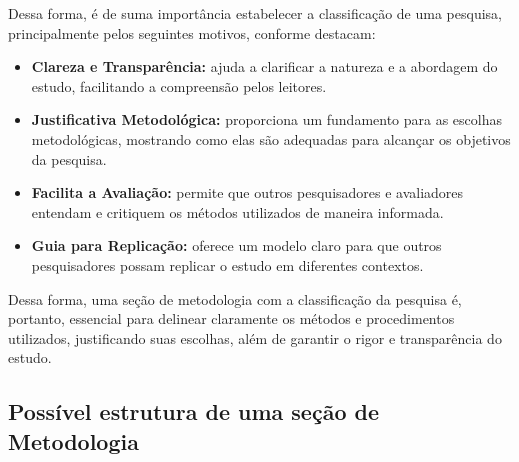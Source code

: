 Dessa forma, é de suma importância estabelecer a classificação de uma pesquisa, principalmente pelos seguintes motivos, conforme  destacam:
\begin{itemize}[itemsep=0pt, leftmargin=2.3cm]
    \item \textbf{Clareza e Transparência:} ajuda a clarificar a natureza e a abordagem do estudo, facilitando a compreensão pelos leitores.
    \item \textbf{Justificativa Metodológica:} proporciona um fundamento para as escolhas metodológicas, mostrando como elas são adequadas para alcançar os objetivos da pesquisa.
    \item \textbf{Facilita a Avaliação:} permite que outros pesquisadores e avaliadores entendam e critiquem os métodos utilizados de maneira informada.
    \item \textbf{Guia para Replicação:} oferece um modelo claro para que outros pesquisadores possam replicar o estudo em diferentes contextos.
\end{itemize}

Dessa forma, uma seção de metodologia com a classificação da pesquisa é, portanto, essencial para delinear claramente os métodos e procedimentos utilizados, justificando suas escolhas, além de garantir o rigor e transparência do estudo.

\subsection{Possível estrutura de uma seção de Metodologia}

